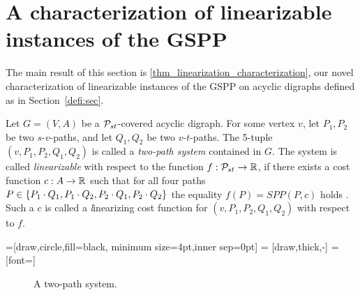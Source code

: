 \section{A characterization of linearizable instances of  the GSPP}\label{charact:sec}
 The main result of this section is \cref{thm_linearization_characterization}, our novel characterization of  linearizable instances of the GSPP on acyclic digraphs defined as in Section~\ref{defi:sec}. 
\begin{definition}
Let $G=(V,A)$ be a $\mathcal{P}_{st}$-covered acyclic digraph. For some vertex $v$, let $P_1, P_2$ be two $s$-$v$-paths, and let $Q_1, Q_2$ be two $v$-$t$-paths. The 5-tuple $(v,P_1,P_2,Q_1,Q_2)$ is called a \emph{two-path system} contained in $G$. The system is called \emph{linearizable} with respect to the function $f : \mathcal{P}_{st} \rightarrow \mathbb{R}$, if there exists a cost function $c : A \rightarrow \mathbb{R}$ such that for all four paths $P \in \{ P_1 \cdot Q_1, P_1 \cdot Q_2, P_2 \cdot Q_1, P_2 \cdot Q_2 \}$ the equality  $f(P) = SPP(P,c)$ holds
. Such a $c$ is called  a {\emph linearizing cost function} for  $(v,P_1,P_2,Q_1,Q_2)$ with respect to $f$. 
\end{definition}

=[draw,circle,fill=black, minimum size=4pt,inner sep=0pt]
 = [draw,thick,-]
 = [font=\small]
\begin{figure}[bth]
\centering
{}
\caption{A two-path system.}
 \label{fig:two-path-system}
\end{figure}

